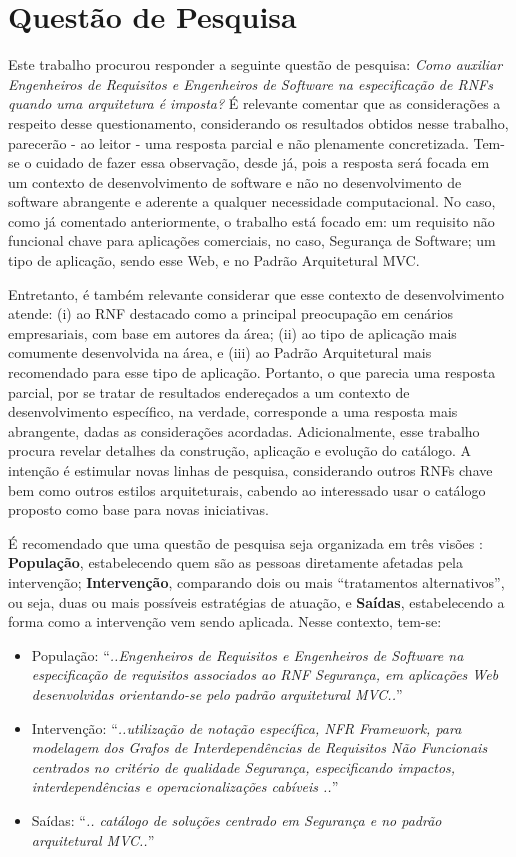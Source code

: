 \section{Questão de Pesquisa}
Este trabalho procurou responder a seguinte questão de pesquisa: \textit{Como auxiliar Engenheiros de Requisitos e Engenheiros de Software na especificação de RNFs quando uma arquitetura é imposta?} É relevante comentar que as considerações a respeito desse questionamento, considerando os resultados obtidos nesse trabalho, parecerão - ao leitor - uma resposta parcial e não plenamente concretizada. Tem-se o cuidado de fazer essa observação, desde já, pois a resposta será focada em um contexto de desenvolvimento de software e não no desenvolvimento de software abrangente e aderente a qualquer necessidade computacional. No caso, como já comentado anteriormente, o trabalho está focado em: um requisito não funcional chave para aplicações comerciais, no caso, Segurança de Software; um tipo de aplicação, sendo esse Web, e no Padrão Arquitetural MVC. 

Entretanto, é também relevante considerar que esse contexto de desenvolvimento atende: (i) ao RNF destacado como a principal preocupação em cenários empresariais, com base em autores da área; (ii) ao tipo de aplicação mais comumente desenvolvida na área, e (iii) ao Padrão Arquitetural mais recomendado para esse tipo de aplicação. Portanto, o que parecia uma resposta parcial, por se tratar de resultados endereçados a um contexto de desenvolvimento específico, na verdade, corresponde a uma resposta mais abrangente, dadas as considerações acordadas. Adicionalmente, esse trabalho procura revelar detalhes da construção, aplicação e evolução do catálogo. A intenção é estimular novas linhas de pesquisa, considerando outros RNFs chave bem como outros estilos arquiteturais, cabendo ao interessado usar o catálogo proposto como base para novas iniciativas.

É recomendado que uma questão de pesquisa seja organizada em três visões \cite{keele2007guidelines}: 
\textbf{População}, estabelecendo quem são as pessoas diretamente afetadas pela intervenção; \textbf{Intervenção}, comparando dois ou mais “tratamentos alternativos”, ou seja, duas ou mais possíveis estratégias de atuação, e \textbf{Saídas}, estabelecendo a forma como a intervenção vem sendo aplicada. Nesse contexto, tem-se: 

\begin{itemize}
	\item População: “\textit{..Engenheiros de Requisitos e Engenheiros de Software na especificação de requisitos associados ao RNF Segurança, em aplicações Web desenvolvidas orientando-se pelo padrão arquitetural MVC..}”
	\item Intervenção: “\textit{..utilização de notação específica, NFR Framework, para modelagem dos Grafos de Interdependências de Requisitos Não Funcionais centrados no critério de qualidade Segurança, especificando impactos, interdependências e operacionalizações cabíveis  ..}”
	\item Saídas: “\textit{.. catálogo de soluções centrado em Segurança e no padrão arquitetural MVC..}”
\end{itemize}

